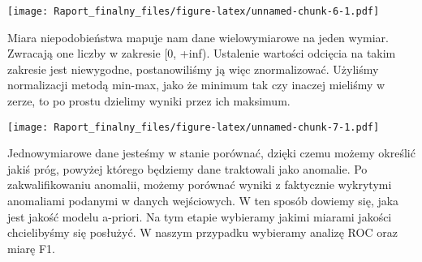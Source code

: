 \documentclass[
]{article}
\newenvironment{Shaded}{\begin{snugshade}}{\end{snugshade}}
\newcommand{\DataTypeTok}[1]{\textcolor[rgb]{0.13,0.29,0.53}{#1}}
\newcommand{\DecValTok}[1]{\textcolor[rgb]{0.00,0.00,0.81}{#1}}
\newcommand{\FloatTok}[1]{\textcolor[rgb]{0.00,0.00,0.81}{#1}}
\newcommand{\KeywordTok}[1]{\textcolor[rgb]{0.13,0.29,0.53}{\textbf{#1}}}
\newcommand{\NormalTok}[1]{#1}
\newcommand{\OperatorTok}[1]{\textcolor[rgb]{0.81,0.36,0.00}{\textbf{#1}}}
\newcommand{\StringTok}[1]{\textcolor[rgb]{0.31,0.60,0.02}{#1}}
\begin{document}
\texttt{[image: Raport\_finalny\_files/figure-latex/unnamed-chunk-6-1.pdf]}

Miara niepodobieństwa mapuje nam dane wielowymiarowe na jeden wymiar.
Zwracają one liczby w zakresie {[}0, +inf). Ustalenie wartości odcięcia
na takim zakresie jest niewygodne, postanowiliśmy ją więc znormalizować.
Użyliśmy normalizacji metodą min-max, jako że minimum tak czy inaczej
mieliśmy w zerze, to po prostu dzielimy wyniki przez ich maksimum.

\begin{Shaded}
\end{Shaded}

\texttt{[image: Raport\_finalny\_files/figure-latex/unnamed-chunk-7-1.pdf]}

Jednowymiarowe dane jesteśmy w stanie porównać, dzięki czemu możemy
określić jakiś próg, powyżej którego będziemy dane traktowali jako
anomalie. Po zakwalifikowaniu anomalii, możemy porównać wyniki z
faktycznie wykrytymi anomaliami podanymi w danych wejściowych. W ten
sposób dowiemy się, jaka jest jakość modelu a-priori. Na tym etapie
wybieramy jakimi miarami jakości chcielibyśmy się posłużyć. W naszym
przypadku wybieramy analizę ROC oraz miarę F1.

\begin{Shaded}
\end{Shaded}
\end{document}
